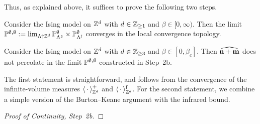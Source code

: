 Thus, as explained above, it suffices to prove the following two steps.

\begin{lemma}\label{lemma:continuity_step2b}
    Consider the Ising model on $\Z^d$ with $d\in\Z_{\geq 1}$
    and $\beta\in[0,\infty)$.
    Then the limit $\P^{\emptyset,\emptyset}:=
        \lim_{\Lambda\uparrow\Z^d}
        \P_{\Lambda^\frakg}^\emptyset\times\P_{\Lambda^\f}^\emptyset
        $ converges in the local convergence topology.
\end{lemma}

\begin{lemma}\label{lemma:continuity_step2c}
    Consider the Ising model on $\Z^d$ with $d\in\Z_{\geq 3}$
    and $\beta\in[0,\beta_c]$.
    Then $\widehat{\n+\m}$ does not percolate in the limit $\P^{\emptyset,\emptyset}$ constructed
    in Step~2b.
\end{lemma}

The first statement is straightforward, and follows
from the convergence of the infinite-volume measures $\langle\blank\rangle^+_{\Z^d}$
and $\langle\blank\rangle^\f_{\Z^d}$.
For the second statement, we combine a simple version of the Burton--Keane argument
with the infrared bound.


\begin{proof}[Proof of Continuity, Step~2b]
\end{proof}

